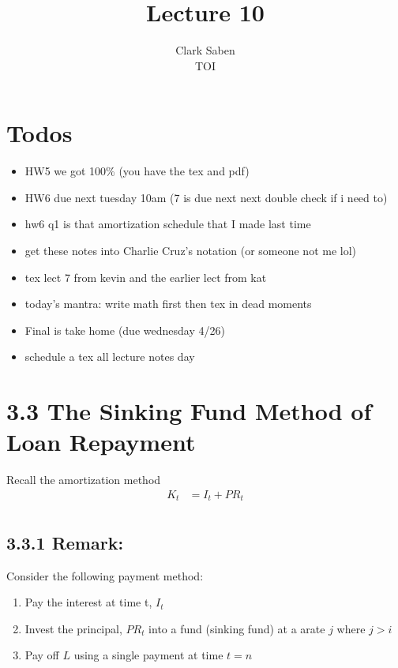 \documentclass[12pt]{article}
\begin{document}
 
 
\title{Lecture 10}%
\author{Clark Saben\\ %
TOI} %
 
\maketitle

\section{Todos}

\begin{itemize}
	\item HW5 we got 100\% (you have the tex and pdf)
	\item HW6 due next tuesday 10am (7 is due next next double check if i need to)
	\item hw6 q1 is that amortization schedule that I made last time
	\item get these notes into Charlie Cruz's notation (or someone not me lol)
	\item tex lect 7 from kevin and the earlier lect from kat
	\item today's mantra: write math first then tex in dead moments
	\item Final is take home (due wednesday 4/26)
	\item schedule a tex all lecture notes day
\end{itemize}

\section{3.3 The Sinking Fund Method of Loan Repayment}
Recall the amortization method
$$
\begin{aligned}
	K_{t} &= I_t + PR_t \\
\end{aligned}
$$
\subsection{3.3.1 Remark:}
Consider the following payment method:
\begin{enumerate}
	\item Pay the interest at time t, $I_t$
	\item Invest the principal, $PR_t$ into a fund (sinking fund) at a arate $j$ where $j>i$
	\item Pay off $L$ using a single payment at time $t=n$
\end{enumerate}
\end{document}
